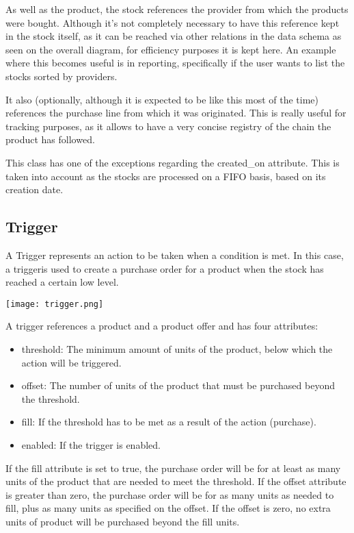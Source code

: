 As well as the product, the stock references the provider from which the products were bought. Although it’s not completely necessary to have this reference kept in the stock itself, as it can be reached via other relations in the data schema as seen on the overall diagram, for efficiency purposes it is kept here. An example where this becomes useful is in reporting, specifically if the user wants to list the stocks sorted by providers.

It also (optionally, although it is expected to be like this most of the time) references the purchase line from which it was originated. This is really useful for tracking purposes, as it allows to have a very concise registry of the chain the product has followed.

This class has one of the exceptions regarding the created\_on attribute. This is taken into account as the stocks are processed on a FIFO basis, based on its creation date.

\subsection{Trigger}
A Trigger represents an action to be taken when a condition is met. In this case, a triggeris used to create a purchase order for a product when the stock has reached a certain low level.

\begin{center}
\texttt{[image: trigger.png]}
\end{center}
A trigger references a product and a product offer and has four attributes:

\begin{itemize}
\item threshold: The minimum amount of units of the product, below which the action will be triggered.
\item offset: The number of units of the product that must be purchased beyond the threshold.
\item fill: If the threshold has to be met as a result of the action (purchase).
\item enabled: If the trigger is enabled.
\end{itemize}

If the fill attribute is set to true, the purchase order will be for at least as many units of the product that are needed to meet the threshold. If the offset attribute is greater than zero, the purchase order will be for as many units as needed to fill, plus as many units as specified on the offset. If the offset is zero, no extra units of product will be purchased beyond the fill units.

